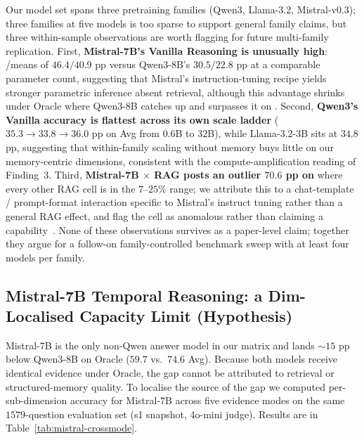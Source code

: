 Our model set spans three pretraining families (Qwen3, Llama-3.2, Mistral-v0.3); three families at five models is too sparse to support general family claims, but three within-sample observations are worth flagging for future multi-family replication.
First, \textbf{Mistral-7B's Vanilla Reasoning is unusually high}: \DThreeID/\DFourID means of $46.4/40.9$ pp versus Qwen3-8B's $30.5/22.8$ pp at a comparable parameter count, suggesting that Mistral's instruction-tuning recipe yields stronger parametric inference absent retrieval, although this advantage shrinks under Oracle where Qwen3-8B catches up and surpasses it on \DFourID.
Second, \textbf{Qwen3's Vanilla accuracy is flattest across its own scale ladder} ($35.3 \to 33.8 \to 36.0$ pp on Avg from $0.6$B to $32$B), while Llama-3.2-3B sits at $34.8$ pp, suggesting that within-family scaling without memory buys little on our memory-centric dimensions, consistent with the compute-amplification reading of Finding~3.
Third, \textbf{Mistral-7B $\times$ RAG posts an outlier $70.6$ pp on \DFiveID} where every other RAG cell is in the $7$--$25\%$ range; we attribute this to a chat-template / prompt-format interaction specific to Mistral's instruct tuning rather than a general RAG effect, and flag the cell as anomalous rather than claiming a capability~\citep{gu2024llmjudge_survey}.
None of these observations survives as a paper-level claim; together they argue for a follow-on family-controlled benchmark sweep with at least four models per family.

\subsection{Mistral-7B Temporal Reasoning: a Dim-Localised Capacity Limit (Hypothesis)}
\label{app:mistral-d8}

Mistral-7B is the only non-Qwen answer model in our matrix and lands $\sim\!15$ pp below Qwen3-8B on Oracle ($59.7$ vs.\ $74.6$ Avg). Because both models receive identical evidence under Oracle, the gap cannot be attributed to retrieval or structured-memory quality. To localise the source of the gap we computed per-sub-dimension accuracy for Mistral-7B across five evidence modes on the same $1579$-question evaluation set (s1 snapshot, 4o-mini judge). Results are in Table~\ref{tab:mistral-crossmode}.


